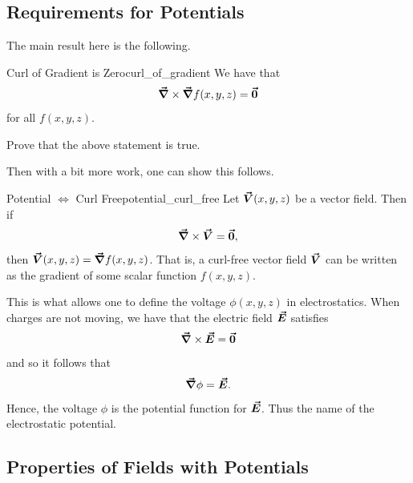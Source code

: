                    	        \subsection{Requirements for Potentials}

                   	        The main result here is the following.

                   	        \begin{prop}{Curl of Gradient is Zero}{curl_of_gradient}
                   	        We have that
                   	        \[
                   	        \boldsymbol{\vec{\nabla}} \times \boldsymbol{\vec{\nabla}} f(x,y,z) = \boldsymbol{\vec{0}}
                   	        \]
                   	        for all $f(x,y,z)$.
                   	        \end{prop}

                   	        \begin{exercise}
                   	        	Prove that the above statement is true.
                   	        \end{exercise}

                   	        Then with a bit more work, one can show this follows.

                   	        \begin{thm}{Potential $\iff$ Curl Free}{potential_curl_free}
                   	        Let $\boldsymbol{\vec{V}}(x,y,z)$ be a vector field.  Then if
                   	        \[
                   	        \boldsymbol{\vec{\nabla}} \times \boldsymbol{\vec{V}} = \boldsymbol{\vec{0}},
                   	        \]
                   	        then $\boldsymbol{\vec{V}}(x,y,z) = \boldsymbol{\vec{\nabla}} f(x,y,z)$.  That is, a curl-free vector field $\boldsymbol{\vec{V}}$ can be written as the gradient of some scalar function $f(x,y,z)$.
                   	        \end{thm}

                   	        This is what allows one to define the voltage $\phi(x,y,z)$ in electrostatics.  When charges are not moving, we have that the electric field $\boldsymbol{\vec{E}}$ satisfies
                   	        \[
                   	        \boldsymbol{\vec{\nabla}} \times \boldsymbol{\vec{E}} = \boldsymbol{\vec{0}}
                   	        \]
                   	        and so it follows that
                   	        \[
                   	        \boldsymbol{\vec{\nabla}} \phi= \boldsymbol{\vec{E}}.
                   	        \]
                   	        Hence, the voltage $\phi$ is the potential function for $\boldsymbol{\vec{E}}$. Thus the name of the electrostatic potential.

                   	        \subsection{Properties of Fields with Potentials}

